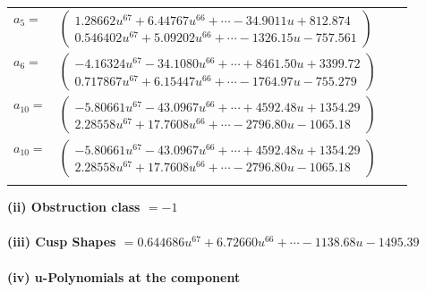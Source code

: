 \documentclass[1p]{elsarticle_modified}
\theoremstyle{definition}
\begin{document}
\begin{tabular}{m{7pt} m{180pt} m{7pt} m{180pt} }
\flushright $a_{5}=$&$\begin{pmatrix}1.28662 u^{67}+6.44767 u^{66}+\cdots-34.9011 u+812.874\\0.546402 u^{67}+5.09202 u^{66}+\cdots-1326.15 u-757.561\end{pmatrix}$ \\
\flushright $a_{6}=$&$\begin{pmatrix}-4.16324 u^{67}-34.1080 u^{66}+\cdots+8461.50 u+3399.72\\0.717867 u^{67}+6.15447 u^{66}+\cdots-1764.97 u-755.279\end{pmatrix}$ \\
\flushright $a_{10}=$&$\begin{pmatrix}-5.80661 u^{67}-43.0967 u^{66}+\cdots+4592.48 u+1354.29\\2.28558 u^{67}+17.7608 u^{66}+\cdots-2796.80 u-1065.18\end{pmatrix}$\\ \flushright $a_{10}=$&$\begin{pmatrix}-5.80661 u^{67}-43.0967 u^{66}+\cdots+4592.48 u+1354.29\\2.28558 u^{67}+17.7608 u^{66}+\cdots-2796.80 u-1065.18\end{pmatrix}$\\&\end{tabular}
\flushleft \textbf{(ii) Obstruction class $= -1$}\\~\\
\flushleft \textbf{(iii) Cusp Shapes $= 0.644686 u^{67}+6.72660 u^{66}+\cdots-1138.68 u-1495.39$}\\~\\
\newpage\renewcommand{\arraystretch}{1}
\flushleft \textbf{(iv) u-Polynomials at the component}\newline \\
\end{document}
